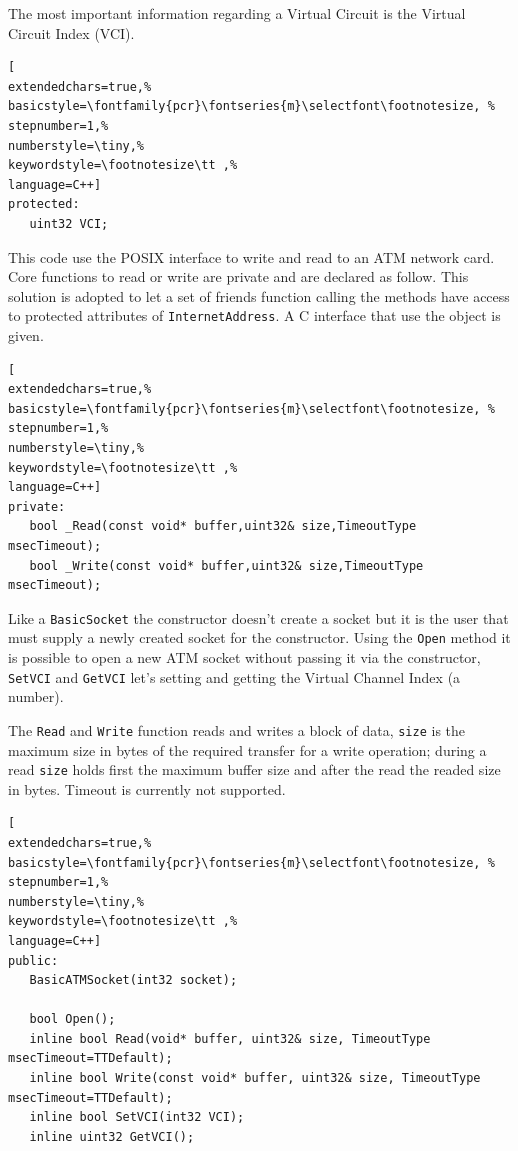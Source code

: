 The most important information regarding a Virtual Circuit is the Virtual Circuit Index (VCI).

\begin{lstlisting}[
extendedchars=true,%
basicstyle=\fontfamily{pcr}\fontseries{m}\selectfont\footnotesize, %
stepnumber=1,%
numberstyle=\tiny,%
keywordstyle=\footnotesize\tt ,%
language=C++]
protected:
   uint32 VCI;
\end{lstlisting}

This code use the POSIX interface to write and read to an ATM network card. Core functions to read or write are private and are declared as follow. This solution is adopted to let a set of friends function calling the methods have access to protected attributes of \texttt{InternetAddress}. A C interface that use the object is given.

\begin{lstlisting}[
extendedchars=true,%
basicstyle=\fontfamily{pcr}\fontseries{m}\selectfont\footnotesize, %
stepnumber=1,%
numberstyle=\tiny,%
keywordstyle=\footnotesize\tt ,%
language=C++]
private:
   bool _Read(const void* buffer,uint32& size,TimeoutType msecTimeout);
   bool _Write(const void* buffer,uint32& size,TimeoutType msecTimeout);
\end{lstlisting}

Like a \texttt{BasicSocket} the constructor doesn't create a socket but it is the user that must supply a newly created socket for the constructor. Using the \texttt{Open} method it is possible to open a new ATM socket without passing it via the constructor, \texttt{SetVCI} and \texttt{GetVCI} let's setting and getting the Virtual Channel Index (a number).

The \texttt{Read} and \texttt{Write} function reads and writes a block of data, \texttt{size} is the maximum size in bytes of the required transfer for a write operation; during a read \texttt{size} holds first the maximum buffer size and after the read the readed size in bytes. Timeout is currently not supported.

\begin{lstlisting}[
extendedchars=true,%
basicstyle=\fontfamily{pcr}\fontseries{m}\selectfont\footnotesize, %
stepnumber=1,%
numberstyle=\tiny,%
keywordstyle=\footnotesize\tt ,%
language=C++]
public:
   BasicATMSocket(int32 socket);

   bool Open();
   inline bool Read(void* buffer, uint32& size, TimeoutType msecTimeout=TTDefault);
   inline bool Write(const void* buffer, uint32& size, TimeoutType msecTimeout=TTDefault);
   inline bool SetVCI(int32 VCI);
   inline uint32 GetVCI();
\end{lstlisting}

